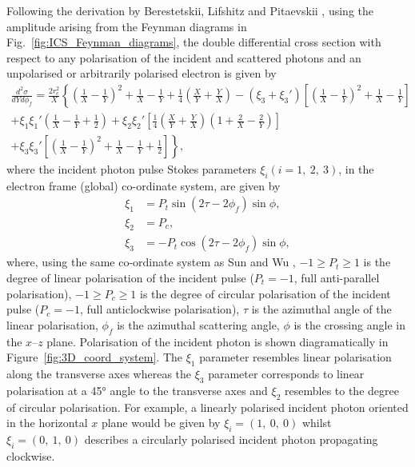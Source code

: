 \documentclass[../main.tex]{subfiles}
\begin{document}
Following the derivation by Berestetskii, Lifshitz and Pitaevskii \cite{berestetskii1982quantum}, using the amplitude arising from the Feynman diagrams in Fig.~\ref{fig:ICS_Feynman_diagrams}, the double differential cross section with respect to any polarisation of the incident and scattered photons and an unpolarised or arbitrarily polarised electron is given by 
\begin{multline}
\frac{d^{2}\sigma}{dYd\phi_{f}} = \frac{2r_{e}^{2}}{X}\left\{\left(\frac{1}{X}-\frac{1}{Y}\right)^{2}+\frac{1}{X}-\frac{1}{Y}+\frac{1}{4}\left(\frac{X}{Y}+\frac{Y}{X}\right)  -\left(\xi_{3}+\xi_{3}'\right)\left[\left(\frac{1}{X}-\frac{1}{Y}\right)^{2}+\frac{1}{X}-\frac{1}{Y}\right] \right.\\\left. +\xi_{1}\xi_{1}'\left(\frac{1}{X}-\frac{1}{Y}+\frac{1}{2}\right) + \xi_{2}\xi_{2}'\left[\frac{1}{4}\left(\frac{X}{Y}+\frac{Y}{X}\right)\left(1+\frac{2}{X}-\frac{2}{Y}\right)\right] \right.\\\left. + \xi_{3}\xi_{3}'\left[\left(\frac{1}{X}-\frac{1}{Y}\right)^{2}+\frac{1}{X}-\frac{1}{Y}+\frac{1}{2}\right] \right\},
\label{eq:polarisation_differential_cross_section}    
\end{multline}
where the incident photon pulse Stokes parameters $\xi_{i} \left(i=1,~2,~3\right)$, in the electron frame (global) co-ordinate system, are given by
\begin{align}
\xi_{1} &= P_{t}\sin\left(2\tau-2\phi_{f}\right)\sin\phi, \\
\xi_{2} &= P_{c}, \\
\xi_{3} &= -P_{t}\cos\left(2\tau-2\phi_{f}\right)\sin\phi,
\label{eq:incident_stokes_parameters}    
\end{align}
where, using the same co-ordinate system as Sun and Wu \cite{sun2009characterizations,sun2011theoretical}, $-1 \geq P_{t} \geq 1$ is the degree of linear polarisation of the incident pulse ($P_{t}=-1$, full anti-parallel polarisation), $-1 \geq P_{c} \geq 1$ is the degree of circular polarisation of the incident pulse ($P_{c}=-1$, full anticlockwise polarisation), $\tau$ is the azimuthal angle of the linear polarisation, $\phi_{f}$ is the azimuthal scattering angle, $\phi$ is the crossing angle in the $x$--$z$ plane. Polarisation of the incident photon is shown diagramatically in Figure~\ref{fig:3D_coord_system}. The $\xi_{1}$ parameter resembles linear polarisation along the transverse axes whereas the $\xi_{3}$ parameter corresponds to linear polarisation at a 45\si{\degree} angle to the transverse axes and $\xi_{2}$ resembles to the degree of circular polarisation. For example, a linearly polarised incident photon oriented in the horizontal $x$ plane would be given by $\xi_{i} = \left(1,~0,~0\right)$ whilst $\xi_{i} = \left(0,~1,~0\right)$ describes a circularly polarised incident photon propagating clockwise. 
\end{document}
